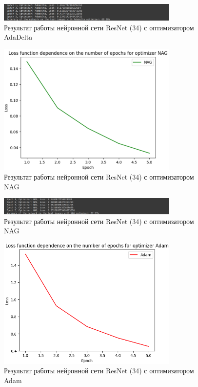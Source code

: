 \documentclass[a4paper, 14pt]{extarticle}
\begin{document}
\begin{figure}[!htb]
	\centering
	\includegraphics[width=0.8\textwidth]{img15}
\caption{Результат работы нейронной сети ResNet (34) с оптимизатором AdaDelta}
\label{fig:img15}
\end{figure}

\begin{figure}[!htb]
	\centering
	\includegraphics[width=0.8\textwidth]{img16}
\caption{Результат работы нейронной сети ResNet (34) с оптимизатором NAG}
\label{fig:img16}
\end{figure}

\begin{figure}[!htb]
	\centering
	\includegraphics[width=0.8\textwidth]{img17}
\caption{Результат работы нейронной сети ResNet (34) с оптимизатором NAG}
\label{fig:img17}
\end{figure}

\begin{figure}[!htb]
	\centering
	\includegraphics[width=0.8\textwidth]{img18}
\caption{Результат работы нейронной сети ResNet (34) с оптимизатором Adam}
\label{fig:img18}
\end{figure}
\end{document}
